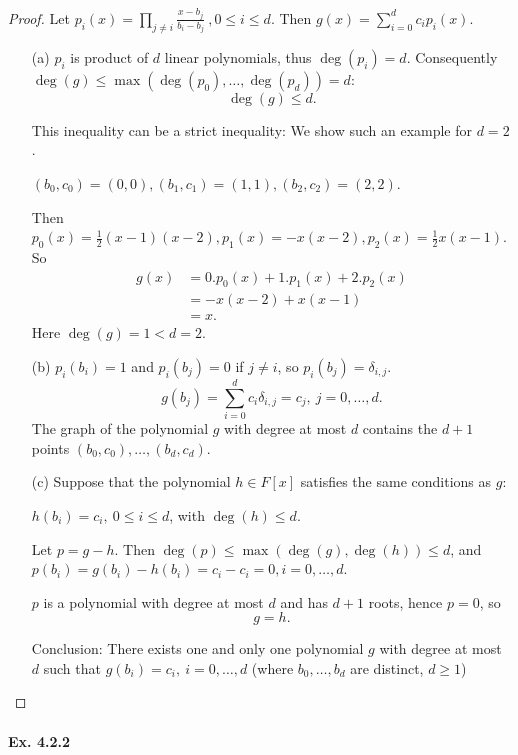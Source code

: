 \documentclass[11pt,a4paper]{article}
\begin{document}
\begin{proof}
Let $p_i(x) = \prod\limits_{j\neq i} \frac{x-b_j}{b_i-b_j}\ , 0 \leq i \leq d$.
Then $g(x) = \sum\limits_{i=0}^d c_i p_i(x)$.

\begin{enumerate}
\item[(a)]
$p_i$ is product of $d$ linear polynomials, thus $\deg(p_i) = d$. Consequently $\deg(g) \leq \max(\deg(p_0), \ldots, \deg(p_d))=d$: 
$$\deg(g)\leq d.$$

This inequality can be a strict inequality: We show such an example for $d=2$.

 $(b_0,c_0) = (0,0), (b_1,c_1) = (1,1), (b_2,c_2) = (2,2)$.

Then $p_0(x) = \frac{1}{2}(x-1)(x-2),p_1(x) = -x(x-2),p_2(x) = \frac{1}{2}x(x-1)$. So
\begin{align*}
g(x)&= 0.p_0(x)+1.p_1(x)+2.p_2(x)\\
&=-x(x-2)+x(x-1)\\
&=x.
\end{align*}
Here $\deg(g)=1 < d=2$.

\item[(b)] $p_i(b_i)=1$ and $p_i(b_j)=0$ if $j\neq i$, so $p_i(b_j) =\delta_{i,j}$.
$$g(b_j) = \sum\limits_{i=0}^dc_i \delta_{i,j} = c_j, \ j=0,\ldots,d.$$
The graph of the polynomial  $g$ with degree at most $d$ contains the $d+1$ points $(b_0,c_0), \ldots,(b_d,c_d)$.

\item[(c)]
Suppose that the polynomial $h \in F[x]$ satisfies the same conditions as $g$: 
\begin{center}
 $h(b_i) = c_i,\  0\leq i\leq d$, with $\deg(h)\leq d$. \end{center}
 Let $p = g-h$. Then $\deg(p) \leq \max(\deg(g),\deg(h)) \leq d$, and $p(b_i) = g(b_i) - h(b_i) = c_i-c_i=0, i = 0,\ldots,d$.
 
 $p$ is a polynomial with degree at most $d$ and has $d+1$ roots, hence $p=0$, so 
 $$g=h.$$
 
Conclusion: There exists one and only one polynomial $g$ with degree at most $d$ such that $g(b_i) = c_i,\  i=0,\ldots,d$ (where $b_0,\ldots,b_d$ are distinct, $d\geq 1$)
\end{enumerate}
\end{proof}

\paragraph{Ex. 4.2.2}
\end{document}
